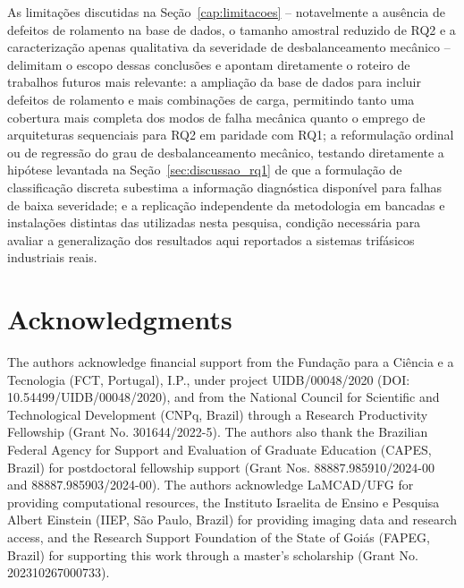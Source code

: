 \documentclass[times,final]{elsarticle}
\begin{document}
As limitações discutidas na Seção~\ref{cap:limitacoes} -- notavelmente a ausência de defeitos de rolamento na base de dados, o tamanho amostral reduzido de RQ2 e a caracterização apenas qualitativa da severidade de desbalanceamento mecânico -- delimitam o escopo dessas conclusões e apontam diretamente o roteiro de trabalhos futuros mais relevante: a ampliação da base de dados para incluir defeitos de rolamento e mais combinações de carga, permitindo tanto uma cobertura mais completa dos modos de falha mecânica quanto o emprego de arquiteturas sequenciais para RQ2 em paridade com RQ1; a reformulação ordinal ou de regressão do grau de desbalanceamento mecânico, testando diretamente a hipótese levantada na Seção~\ref{sec:discussao_rq1} de que a formulação de classificação discreta subestima a informação diagnóstica disponível para falhas de baixa severidade; e a replicação independente da metodologia em bancadas e instalações distintas das utilizadas nesta pesquisa, condição necessária para avaliar a generalização dos resultados aqui reportados a sistemas trifásicos industriais reais.
\section*{Acknowledgments}
The authors acknowledge financial support from the Fundação para a Ciência e a Tecnologia (FCT, Portugal), I.P., under project UIDB/00048/2020 (DOI: 10.54499/UIDB/00048/2020), and from the National Council for Scientific and Technological Development (CNPq, Brazil) through a Research Productivity Fellowship (Grant No. 301644/2022-5). The authors also thank the Brazilian Federal Agency for Support and Evaluation of Graduate Education (CAPES, Brazil) for postdoctoral fellowship support (Grant Nos. 88887.985910/2024-00 and 88887.985903/2024-00). The authors acknowledge LaMCAD/UFG for providing computational resources, the Instituto Israelita de Ensino e Pesquisa Albert Einstein (IIEP, São Paulo, Brazil) for providing imaging data and research access, and the Research Support Foundation of the State of Goiás (FAPEG, Brazil) for supporting this work through a master's scholarship (Grant No. 202310267000733).
\end{document}
